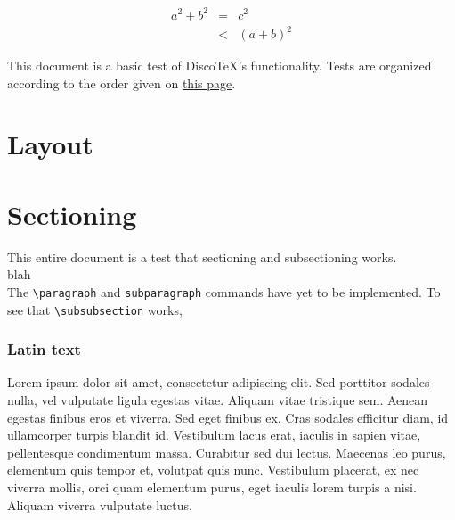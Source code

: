 \documentclass[11pt]{article}
\newcommand{\DiscoTeX}[1]{Disco\TeX}
\newcommand{\ifdisco}[2]{#2}
\begin{document}
\begin{eqnarray}
    a^2+b^2 &=& c^2\\
    &<& (a+b)^2
\end{eqnarray}


\tableofcontents
This document is a basic test of \DiscoTeX{}'s functionality.
Tests are organized according to the order given on \href{ftp://ftp.tex.ac.uk/tex-archive/info/latex2e-help-texinfo/latex2e.html}{this page}.
\section{}%
\section{}%
\section{}%
\section{}%
\section{}%
\section{Layout} %
\section{Sectioning}
This entire \ifdisco{page}{document} is a test that sectioning and subsectioning works.\\
blah\\[2cm]
The \verb|\paragraph| and \verb|subparagraph| commands have yet to be implemented.
To see that \verb|\subsubsection| works,

\subsubsection{Latin text}
Lorem ipsum dolor sit amet, consectetur adipiscing elit. Sed porttitor sodales nulla, vel vulputate ligula egestas vitae. Aliquam vitae tristique sem. Aenean egestas finibus eros et viverra. Sed eget finibus ex. Cras sodales efficitur diam, id ullamcorper turpis blandit id. Vestibulum lacus erat, iaculis in sapien vitae, pellentesque condimentum massa. Curabitur sed dui lectus. Maecenas leo purus, elementum quis tempor et, volutpat quis nunc. Vestibulum placerat, ex nec viverra mollis, orci quam elementum purus, eget iaculis lorem turpis a nisi. Aliquam viverra vulputate luctus.
\end{document}
